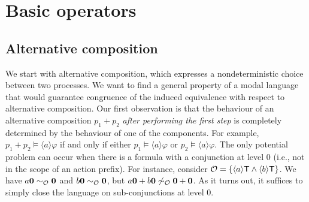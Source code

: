 \documentclass{eptcs}
\def\hmo{{\cal O}}
\def\hmeq{\sim_{\cal O}}
\def\true{{\sf T}}
\newcommand{\diam}[1]{\langle#1\rangle}
\begin{document}
\section{Basic operators}

\subsection {Alternative composition}

We start with alternative composition, which expresses a nondeterministic choice between two processes. We want to find a general property of a modal language that would guarantee congruence of the induced equivalence with respect to alternative composition. Our first observation is that the behaviour of an alternative composition $p_1+p_2$ \textit{after performing the first step} is completely determined by the behaviour of one of the components. For example, $p_1+p_2 \models \diam{a}\varphi$ if and only if either $p_1 \models \diam{a} \varphi$ or $p_2 \models \diam{a} \varphi$. The only potential problem can occur when there is a formula with a conjunction at level 0 (i.e., not in the scope of an action prefix). For instance, consider $ \hmo = \{ \diam{a} \true \wedge \diam{b} \true \} $.  We have $a{\bf 0} \hmeq {\bf 0}$ and $b{\bf 0} \hmeq {\bf 0}$, but $a{\bf 0} + b{\bf 0} \not\hmeq {\bf 0} + {\bf 0}$. As it turns out, it suffices to simply close the language on sub-conjunctions at level 0.
  
\end{document}
